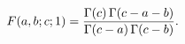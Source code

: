 \[\mathop{F\/}\nolimits\!\left(a,b;c;1\right)=\frac{\mathop{\Gamma\/}\nolimits\!%
\left(c\right)\mathop{\Gamma\/}\nolimits\!\left(c-a-b\right)}{\mathop{\Gamma\/%
}\nolimits\!\left(c-a\right)\mathop{\Gamma\/}\nolimits\!\left(c-b\right)}.\]